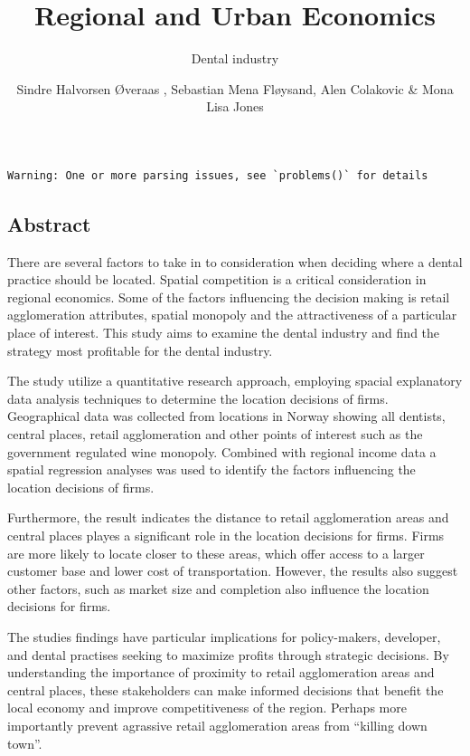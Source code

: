 \documentclass[
  10,
  a4paper,
]{article}
\title{Regional and Urban Economics}
\subtitle{Dental industry}
\author{Sindre Halvorsen Øveraas , Sebastian Mena Fløysand, Alen
Colakovic \& Mona Lisa Jones}
\date{}
\begin{document}
\maketitle
\ifdefined\Shaded\renewenvironment{Shaded}{\begin{tcolorbox}[sharp corners, frame hidden, breakable, boxrule=0pt, borderline west={3pt}{0pt}{shadecolor}, enhanced, interior hidden]}{\end{tcolorbox}}\fi

\begin{verbatim}
Warning: One or more parsing issues, see `problems()` for details
\end{verbatim}

\hypertarget{abstract}{%
\subsection{Abstract}\label{abstract}}

There are several factors to take in to consideration when deciding
where a dental practice should be located. Spatial competition is a
critical consideration in regional economics. Some of the factors
influencing the decision making is retail agglomeration attributes,
spatial monopoly and the attractiveness of a particular place of
interest. This study aims to examine the dental industry and find the
strategy most profitable for the dental industry.

The study utilize a quantitative research approach, employing spacial
explanatory data analysis techniques to determine the location decisions
of firms. Geographical data was collected from locations in Norway
showing all dentists, central places, retail agglomeration and other
points of interest such as the government regulated wine monopoly.
Combined with regional income data a spatial regression analyses was
used to identify the factors influencing the location decisions of
firms.

Furthermore, the result indicates the distance to retail agglomeration
areas and central places playes a significant role in the location
decisions for firms. Firms are more likely to locate closer to these
areas, which offer access to a larger customer base and lower cost of
transportation. However, the results also suggest other factors, such as
market size and completion also influence the location decisions for
firms.

The studies findings have particular implications for policy-makers,
developer, and dental practises seeking to maximize profits through
strategic decisions. By understanding the importance of proximity to
retail agglomeration areas and central places, these stakeholders can
make informed decisions that benefit the local economy and improve
competitiveness of the region. Perhaps more importantly prevent
agrassive retail agglomeration areas from ``killing down town''.
\end{document}
